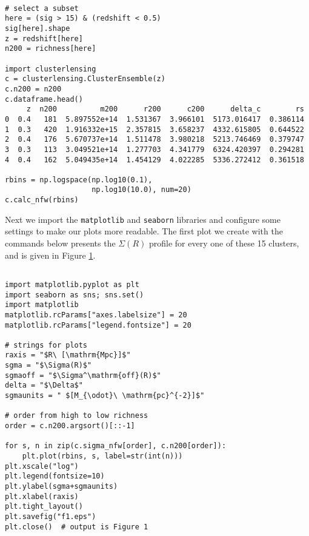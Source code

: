 \documentclass[twocolumn]{aastex6}
\newcommand{\code}{\lstinline[style=codeintext]}
\begin{document}
\begin{lstlisting}

# select a subset
here = (sig > 15) & (redshift < 0.5)
sig[here].shape
z = redshift[here]
n200 = richness[here]

import clusterlensing
c = clusterlensing.ClusterEnsemble(z)
c.n200 = n200
c.dataframe.head()
     z  n200          m200      r200      c200      delta_c        rs
0  0.4   181  5.897552e+14  1.531367  3.966101  5173.016417  0.386114
1  0.3   420  1.916332e+15  2.357815  3.658237  4332.615805  0.644522
2  0.4   176  5.670737e+14  1.511478  3.980218  5213.746469  0.379747
3  0.3   113  3.049521e+14  1.277703  4.341779  6324.420397  0.294281
4  0.4   162  5.049435e+14  1.454129  4.022285  5336.272412  0.361518

rbins = np.logspace(np.log10(0.1),
                    np.log10(10.0), num=20)
c.calc_nfw(rbins)
\end{lstlisting}

Next we import the \code{matplotlib} and \code{seaborn} libraries and configure some settings to make our plots more readable. The first plot we create with the commands below presents the $\Sigma(R)$ profile for every one of these 15 clusters, and is given in Figure \ref{f1}.

\begin{lstlisting}

import matplotlib.pyplot as plt
import seaborn as sns; sns.set()
import matplotlib
matplotlib.rcParams["axes.labelsize"] = 20
matplotlib.rcParams["legend.fontsize"] = 20

# strings for plots
raxis = "$R\ [\mathrm{Mpc}]$"
sgma = "$\Sigma(R)$"
sgmaoff = "$\Sigma^\mathrm{off}(R)$"
delta = "$\Delta$"
sgmaunits = " $[M_{\odot}\ \mathrm{pc}^{-2}]$"

# order from high to low richness
order = c.n200.argsort()[::-1]

for s, n in zip(c.sigma_nfw[order], c.n200[order]):
    plt.plot(rbins, s, label=str(int(n)))
plt.xscale("log")
plt.legend(fontsize=10)
plt.ylabel(sgma+sgmaunits)
plt.xlabel(raxis)
plt.tight_layout()
plt.savefig("f1.eps")
plt.close()  # output is Figure 1

\end{lstlisting}

\begin{figure}\label{f1}
\end{figure}
\end{document}
